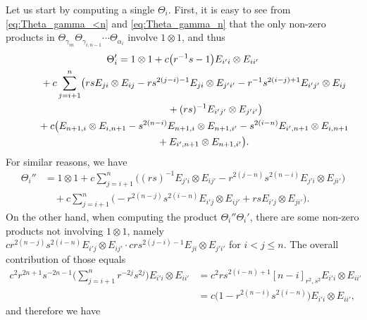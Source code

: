 \documentclass[pdftex]{sigma}
\numberwithin{equation}{section}
\begin{document}
Let us start by computing a single $\Theta_{i}$. First, it is easy to see from \eqref{eq:Theta_gamma_<n} and \eqref{eq:Theta_gamma_n} that the only non-zero products in $\Theta_{\gamma_{in}}\Theta_{\gamma_{i,n-1}}\cdots \Theta_{\alpha_{i}}$ involve $1 \otimes 1$, and thus
\begin{gather*}
 \Theta_{i}' = 1 \otimes 1 + c\bigl(r^{-1}s-1\bigr)E_{i'i} \otimes E_{ii'} \\
 \hphantom{\Theta_{i}' =}{}
 + c\sum_{j = i + 1}^{n}\bigl(rsE_{ji} \otimes E_{ij} - rs^{2(j - i) - 1}E_{ji} \otimes E_{j'i'} - r^{-1}s^{2(i-j) + 1}E_{i'j'} \otimes E_{ij}
 \\
 \hphantom{\Theta_{i}' =+ c\sum_{j = i + 1}^{n}\bigl(}{}
 + (rs)^{-1}E_{i'j'} \otimes E_{j'i'}\bigr) \\
 \hphantom{\Theta_{i}' =}{}
 + c\bigl(E_{n + 1,i} \otimes E_{i,n+1} - s^{2(n - i)}E_{n + 1,i} \otimes E_{n+1, i'} - s^{2(i - n)}E_{i',n + 1} \otimes E_{i,n + 1} \\
 \hphantom{\Theta_{i}' =+ c\bigl(}{}
 + E_{i',n + 1} \otimes E_{n + 1,i'} \bigr).
\end{gather*}
For similar reasons, we have
\begin{align*}
 \Theta_{i}'' &{}= 1 \otimes 1 + c\sum_{j = i + 1}^{n}\bigl((rs)^{-1}E_{j'i} \otimes E_{ij'} - r^{2(j - n)}s^{2(n - i)}E_{j'i} \otimes E_{ji'}\bigr) \\
 &\quad{} +c\sum_{j = i + 1}^{n}\bigl(- r^{2(n - j)}s^{2(i - n)}E_{i'j} \otimes E_{ij'} + rsE_{i'j} \otimes E_{ji'} \bigr).
\end{align*}
On the other hand, when computing the product $\Theta_{i}''\Theta_{i}'$, there are some non-zero products not involving $1 \otimes 1$, namely $cr^{2(n - j)}s^{2(i - n)}E_{i'j} \otimes E_{ij'} \cdot crs^{2(j - i) - 1}E_{ji} \otimes E_{j'i'}$ for $i < j \le n$. The overall contribution of those equals
\begin{displaymath}
\begin{split}
 c^{2}r^{2n + 1}s^{-2n - 1}\Biggl(\sum_{j = i + 1}^{n}r^{-2j}s^{2j} \Biggr)E_{i'i} \otimes E_{ii'} &= c^{2}rs^{2(i - n) + 1}[n - i]_{r^{2},s^{2}} E_{i'i} \otimes E_{ii'} \\
 & = c\bigl(1-r^{2(n - i)}s^{2(i - n)} \bigr)E_{i'i} \otimes E_{ii'},
\end{split}
\end{displaymath}
and therefore we have
\end{document}
